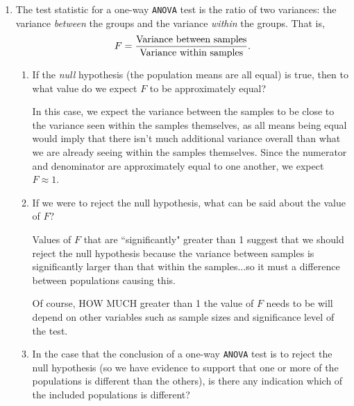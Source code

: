 \documentclass{article}
\begin{document}
\newcommand{\answer}[1]{\color{red}#1}

\pagestyle{myheadings}

\begin{center}
\textbf{}
\end{center}

\begin{enumerate}

\item The test statistic for a one-way \texttt{ANOVA} test is the ratio of two variances: the variance {\em between} the groups and the variance {\em within} the groups.  That is, $$ F = \frac{\textnormal{Variance between samples}}{\textnormal{Variance within samples}}.$$ 
	\begin{enumerate}
	\item If the {\em null} hypothesis (the population means are all equal) is true, then to what value do we expect $F$ to be approximately equal? 
	
	{\answer In this case, we expect the variance between the samples to be close to the variance seen within the samples themselves, as all means being equal would imply that there isn't much additional variance overall than what we are already seeing within the samples themselves.  Since the numerator and denominator are approximately equal to one another, we expect $F \approx 1$. } 
	
	\item If we were to reject the null hypothesis, what can be said about the value of $F$? 
	
	{\answer Values of $F$ that are ``significantly" greater than 1 suggest that we should reject the null hypothesis because the variance between samples is significantly larger than that within the samples...so it must a difference between populations causing this. 
	
	Of course, HOW MUCH greater than 1 the value of $F$ needs to be will depend on other variables such as sample sizes and significance level of the test.} 
	
	\item In the case that the conclusion of a one-way \texttt{ANOVA} test is to reject the null hypothesis (so we have evidence to support that one or more of the populations is different than the others), is there any indication which of the included populations is different? 
	

\end{enumerate}
\end{enumerate}
\end{document}
